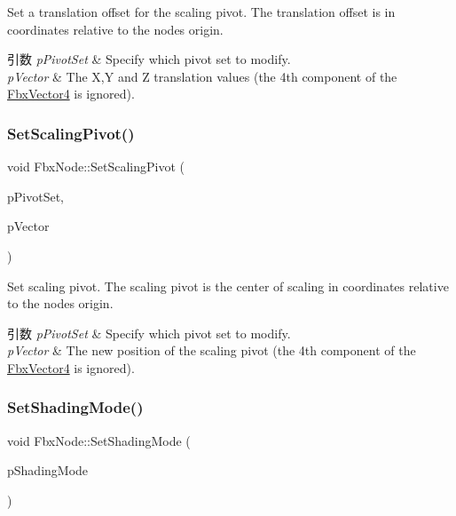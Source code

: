 Set a translation offset for the scaling pivot. The translation offset is in coordinates relative to the node\textquotesingle{}s origin. 
\begin{DoxyParams}{引数}
{\em p\+Pivot\+Set} & Specify which pivot set to modify. \\
\hline
{\em p\+Vector} & The X,Y and Z translation values (the 4th component of the \hyperlink{class_fbx_vector4}{Fbx\+Vector4} is ignored). \\
\hline
\end{DoxyParams}
\mbox{\label{class_fbx_node_a461d9d65ccd7ca051dbc85e56e9d672e}} 
\subsubsection{\texorpdfstring{Set\+Scaling\+Pivot()}{SetScalingPivot()}}
{\footnotesize\ttfamily void Fbx\+Node\+::\+Set\+Scaling\+Pivot (\begin{DoxyParamCaption}\item[{\hyperlink{class_fbx_node_ae62b7311ac4727654cdf1ebd5cbf7343}{E\+Pivot\+Set}}]{p\+Pivot\+Set,  }\item[{\hyperlink{class_fbx_vector4}{Fbx\+Vector4}}]{p\+Vector }\end{DoxyParamCaption})}

Set scaling pivot. The scaling pivot is the center of scaling in coordinates relative to the node\textquotesingle{}s origin. 
\begin{DoxyParams}{引数}
{\em p\+Pivot\+Set} & Specify which pivot set to modify. \\
\hline
{\em p\+Vector} & The new position of the scaling pivot (the 4th component of the \hyperlink{class_fbx_vector4}{Fbx\+Vector4} is ignored). \\
\hline
\end{DoxyParams}
\mbox{\label{class_fbx_node_a61b51ec80b6214984bfb4739fc00ea93}} 
\subsubsection{\texorpdfstring{Set\+Shading\+Mode()}{SetShadingMode()}}
{\footnotesize\ttfamily void Fbx\+Node\+::\+Set\+Shading\+Mode (\begin{DoxyParamCaption}\item[{\hyperlink{class_fbx_node_ab65aa5e41d10dfb4c887667c9a56019d}{E\+Shading\+Mode}}]{p\+Shading\+Mode }\end{DoxyParamCaption})}


